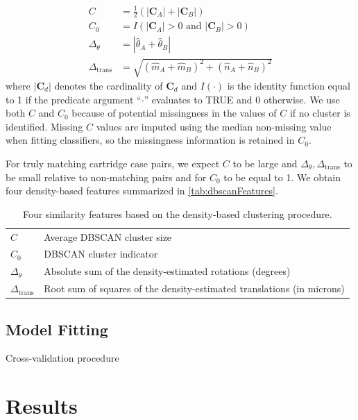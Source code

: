 \documentclass[reprint]{JASA}
\begin{document}
\begin{align*}
C &= \frac{1}{2}\left(|\pmb{C}_A| + |\pmb{C}_B|\right) \\
C_0 &= I(|\pmb{C}_A| > 0 \text{ and } |\pmb{C}_B| > 0)\\
\Delta_\theta &= |\hat{\theta}_A + \hat{\theta}_B| \\
\Delta_{\text{trans}} &= \sqrt{(\hat{m}_A + \hat{m}_B)^2 + (\hat{n}_A + \hat{n}_B)^2}
\end{align*} where \(|\pmb{C}_d|\) denotes the cardinality of
\(\pmb{C}_d\) and \(I(\cdot)\) is the identity function equal to 1 if
the predicate argument ``\(\cdot\)'' evaluates to TRUE and 0 otherwise.
We use both \(C\) and \(C_0\) because of potential missingness in the
values of \(C\) if no cluster is identified. Missing \(C\) values are
imputed using the median non-missing value when fitting classifiers, so
the missingness information is retained in \(C_0\).

For truly matching cartridge case pairs, we expect \(C\) to be large and
\(\Delta_\theta, \Delta_{\text{trans}}\) to be small relative to
non-matching pairs and for \(C_0\) to be equal to 1. We obtain four
density-based features summarized in \autoref{tab:dbscanFeatures}.

\begin{table}[htbp]
\centering
\begin{tabular}{p{.11\linewidth} p{.7\linewidth}}
$C$ & Average DBSCAN cluster size \\
$C_0$ & DBSCAN cluster indicator \\
$\Delta_\theta$ & Absolute sum of the density-estimated rotations (degrees) \\
$\Delta_{\text{trans}}$ & Root sum of squares of the density-estimated translations (in microns)
\end{tabular}
\caption{Four similarity features based on the density-based clustering procedure.}
\label{tab:dbscanFeatures}
\end{table}

\hypertarget{model-fitting}{%
\subsection{Model Fitting}\label{model-fitting}}

Cross-validation procedure

\hypertarget{results}{%
\section{Results}\label{results}}
\end{document}
